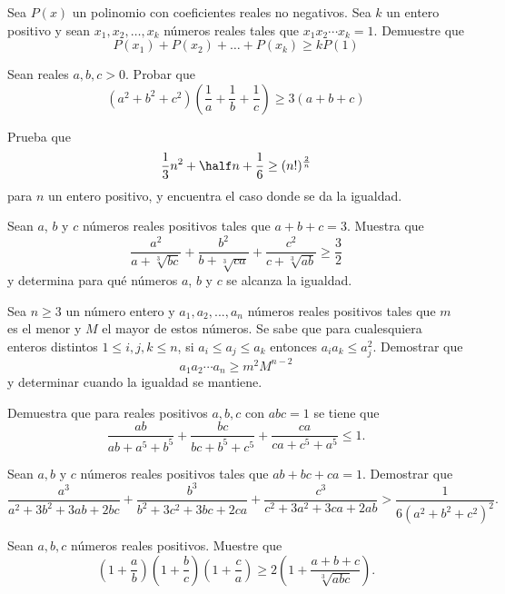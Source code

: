 \documentclass[11pt]{scrartcl}
\begin{document}
\begin{problem}
\label{OMCC2020-5}
Sea $P(x)$ un polinomio con coeficientes reales no negativos. Sea $k$ un entero positivo y sean $x_1,x_2,\ldots,x_k$ números reales tales que $x_1x_2\cdots x_k=1$. Demuestre que
$$P(x_1)+P(x_2)+\ldots+P(x_k)\geq kP(1)$$

\end{problem}
\begin{problem}
Sean reales $a,b,c>0$. Probar que 
\[ \left(a^2+b^2+c^2\right)\left(\frac1a+\frac1b+\frac1c\right) \geq 3(a+b+c)\]
\end{problem}
\begin{problem}
\label{IMOLL1967B2}
Prueba que 
$$\frac 1 3 n^2 +\half n +\frac 1 6 \geq (n!)^{\frac 2 n} $$
para $n$ un entero positivo, y encuentra el caso donde se da la igualdad.
\end{problem}
\begin{problem}
    
    Sean $a$, $b$ y $c$ números reales positivos tales que $a + b + c = 3$. Muestra que 
\[ \frac{a^2}{a + \sqrt[3]{bc}} + \frac{b^2}{b + \sqrt[3]{ca}} + \frac{c^2}{c + \sqrt[3]{ab}} \geq \frac{3}{2} \]
y determina para qué números $a$, $b$ y $c$ se alcanza la igualdad.

    \label{OMM14-3}
\end{problem}
\begin{problem}
    
    Sea $n \geq 3$ un número entero y $a_1,a_2,...,a_n$ números reales positivos tales que $m$ es el menor y $M$ el mayor de estos números. Se sabe que para cualesquiera enteros distintos $1 \leq i,j,k \leq n$, si $a_i \leq a_j \leq a_k$ entonces $a_ia_k \leq a_j^2$. Demostrar que
\[ a_1a_2 \cdots a_n \geq m^2M^{n-2} \]
y determinar cuando la igualdad se mantiene.

    \label{OMCC 2021/5}
\end{problem}
\begin{problem}
    Demuestra que para reales positivos $a,b,c$ con $abc=1$ se tiene que
    \[ \frac{ab}{ab + a^5 + b^5} + \frac{bc}{bc + b^5 + c^5} + \frac{ca}{ca + c^5 + a^5} \leq 1. \]
    \label{IMOSL96A1}
\end{problem}
\begin{problem}
    
    Sean $a, b$ y $c$ números reales positivos tales que $a b+b c+c a=1$. Demostrar que
\[
\frac{a^{3}}{a^{2}+3 b^{2}+3 a b+2 b c}+\frac{b^{3}}{b^{2}+3 c^{2}+3 b c+2 c a}+\frac{c^{3}}{c^{2}+3 a^{2}+3 c a+2 a b}>\frac{1}{6\left(a^{2}+b^{2}+c^{2}\right)^{2}} .\]
    \label{OMCC23-3}
\end{problem}
\begin{problem}
    Sean $a, b, c$ n\'umeros reales positivos. Muestre que
    \begin{equation*}
        \left(1 + \frac{a}{b}\right)\left(1 + \frac{b}{c}\right)\left(1 + \frac{c}{a}\right) \geq 2\left(1+\frac{a+b+c}{\sqrt[3]{abc}}\right).
    \end{equation*}
\label{APMO1998-P3}
\end{problem}
\end{document}
